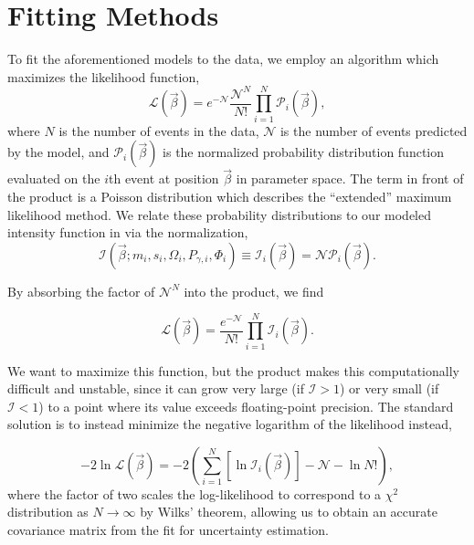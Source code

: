 \section{Fitting Methods}\label{sec:fitting-methods}

To fit the aforementioned models to the data, we employ an algorithm which maximizes the likelihood function,
\begin{equation}
  \mathcal{L}(\vec{\beta}) = e^{-\mathcal{N}} \frac{\mathcal{N}^N}{N!} \prod_{i=1}^{N} \mathcal{P}_i(\vec{\beta}),
  \label{eq:likelihood}
\end{equation}
where $N$ is the number of events in the data, $\mathcal{N}$ is the number of events predicted by the model, and $\mathcal{P}_i(\vec{\beta})$ is the normalized probability distribution function evaluated on the $i$th event at position $\vec{\beta}$ in parameter space. The term in front of the product is a Poisson distribution which describes the ``extended'' maximum likelihood method. We relate these probability distributions to our modeled intensity function in  via the normalization,
\begin{equation}
  \mathcal{I}(\vec{\beta}; m_i, s_i, \Omega_i, P_{\gamma, i}, \Phi_i) \equiv \mathcal{I}_i(\vec{\beta}) = \mathcal{N}\mathcal{P}_i(\vec{\beta}).
\end{equation}

By absorbing the factor of $\mathcal{N}^N$ into the product, we find

\begin{equation}
  \mathcal{L}(\vec{\beta}) = \frac{e^{-\mathcal{N}}}{N!} \prod_{i=1}^{N} \mathcal{I}_i(\vec{\beta}).
\end{equation}

We want to maximize this function, but the product makes this computationally difficult and unstable, since it can grow very large (if $\mathcal{I} > 1$) or very small (if $\mathcal{I} < 1$) to a point where its value exceeds floating-point precision. The standard solution is to instead minimize the negative logarithm of the likelihood instead,

\begin{equation}
  -2 \ln \mathcal{L}(\vec{\beta}) = -2 \left(\sum_{i=1}^{N} \left[\ln \mathcal{I}_i(\vec{\beta})\right] - \mathcal{N} - \ln N! \right),
\end{equation}
where the factor of two scales the log-likelihood to correspond to a $\chi^2$ distribution as $N \to \infty$ by Wilks' theorem, allowing us to obtain an accurate covariance matrix from the fit for uncertainty estimation.

